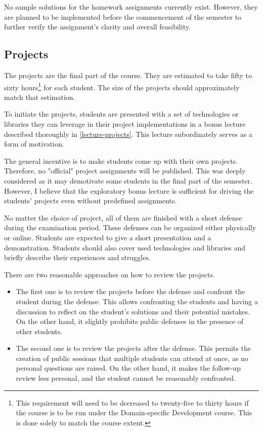 \documentclass[
  digital,
  color,
  oneside,
  nosansbold,
  nocolorbold,
  nolof,
  nolot,
]{fithesis4}
\begin{document}
No sample solutions for the homework assignments currently exist. However, they are planned to be implemented before the commencement of the semester to further verify the assignment's clarity and overall feasibility.

\subsection{Projects}\label{design-projects}

The projects are the final part of the course. They are estimated to take fifty to sixty hours\footnote{This requirement will need to be decreased to twenty-five to thirty hours if the course is to be run under the Domain-specific Development course. This is done solely to match the course extent.} for each student. The size of the projects should approximately match that estimation.

To initiate the projects, students are presented with a set of technologies or libraries they can leverage in their project implementations in a bonus lecture described thoroughly in \cref{lecture-projects}. This lecture subordinately serves as a form of motivation.

The general incentive is to make students come up with their own projects. Therefore, no "official" project assignments will be published. This was deeply considered as it may demotivate some students in the final part of the semester. However, I believe that the exploratory bonus lecture is sufficient for driving the students' projects even without predefined assignments.

No matter the choice of project, all of them are finished with a short defense during the examination period. These defenses can be organized either physically or online. Students are expected to give a short presentation and a demonstration. Students should also cover used technologies and libraries and briefly describe their experiences and struggles.

There are two reasonable approaches on how to review the projects.
\begin{itemize}
    \item The first one is to review the projects before the defense and confront the student during the defense. This allows confronting the students and having a discussion to reflect on the student's solutions and their potential mistakes. On the other hand, it slightly prohibits public defenses in the presence of other students.
    \item The second one is to review the projects after the defense. This permits the creation of public sessions that multiple students can attend at once, as no personal questions are raised. On the other hand, it makes the follow-up review less personal, and the student cannot be reasonably confronted.
\end{itemize}
\end{document}
